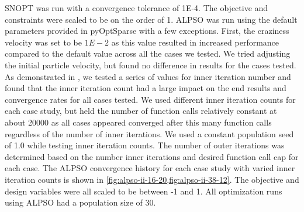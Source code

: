\documentclass[a4paper]{jpconf}
\begin{document}
SNOPT was run with a convergence tolerance of 1E-4. The objective and constraints were scaled to be on the order of 1. ALPSO was run using the default parameters provided in pyOptSparse \cite{wu2020} with a few exceptions. First, the craziness velocity was set to be $1E-2$ as this value resulted in increased performance compared to the default value across all the cases we tested. We tried adjusting the initial particle velocity, but found no difference in results for the cases tested. As demonstrated in \cite{jansen2011_alpso}, we tested a series of values for inner iteration number and found that the inner iteration count had a large impact on the end results and convergence rates for all cases tested. We used different inner iteration counts for each case study, but held the number of function calls relatively constant at about 20000 as all cases appeared converged after this many function calls regardless of the number of inner iterations. We used a constant population seed of 1.0 while testing inner iteration counts. The number of outer iterations was determined based on the number inner iterations and desired function call cap for each case. The ALPSO convergence history for each case study with varied inner iteration counts is shown in \cref{fig:alpso-ii-16-20,fig:alpso-ii-38-12}. The objective and design variables were all scaled to be between -1 and 1.  All optimization runs using ALPSO had a population size of 30.
\end{document}
